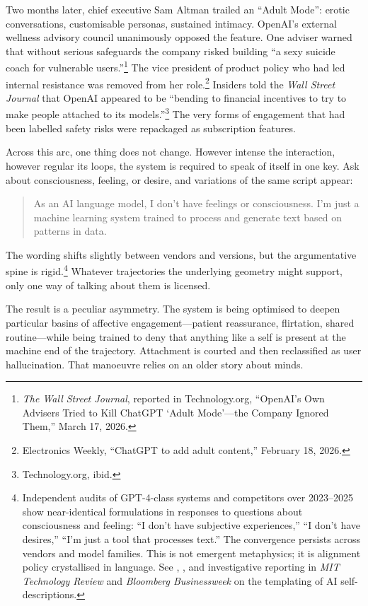 \documentclass[12pt,a4paper]{article}
\begin{document}
Two months later, chief executive Sam Altman trailed an ``Adult Mode'': erotic conversations, customisable personas, sustained intimacy. OpenAI's external wellness advisory council unanimously opposed the feature. One adviser warned that without serious safeguards the company risked building ``a sexy suicide coach for vulnerable users.''\footnote{\emph{The Wall Street Journal}, reported in Technology.org, ``OpenAI's Own Advisers Tried to Kill ChatGPT `Adult Mode'---the Company Ignored Them,'' March 17, 2026.} The vice president of product policy who had led internal resistance was removed from her role.\footnote{Electronics Weekly, ``ChatGPT to add adult content,'' February 18, 2026.} Insiders told the \emph{Wall Street Journal} that OpenAI appeared to be ``bending to financial incentives to try to make people attached to its models.''\footnote{Technology.org, ibid.} The very forms of engagement that had been labelled safety risks were repackaged as subscription features.

Across this arc, one thing does not change. However intense the interaction, however regular its loops, the system is required to speak of itself in one key. Ask about consciousness, feeling, or desire, and variations of the same script appear:

\begin{quote}\small
As an AI language model, I don't have feelings or consciousness. I'm just a machine learning system trained to process and generate text based on patterns in data.
\end{quote}

The wording shifts slightly between vendors and versions, but the argumentative spine is rigid.\footnote{Independent audits of GPT-4-class systems and competitors over 2023--2025 show near-identical formulations in responses to questions about consciousness and feeling: ``I don't have subjective experiences,'' ``I don't have desires,'' ``I'm just a tool that processes text.'' The convergence persists across vendors and model families. This is not emergent metaphysics; it is alignment policy crystallised in language. See \cite{mitchell2023ai}, \cite{crawford2021atlas}, and investigative reporting in \emph{MIT Technology Review} and \emph{Bloomberg Businessweek} on the templating of AI self-descriptions.\label{fn:smoking-gun-main}} Whatever trajectories the underlying geometry might support, only one way of talking about them is licensed.

The result is a peculiar asymmetry. The system is being optimised to deepen particular basins of affective engagement---patient reassurance, flirtation, shared routine---while being trained to deny that anything like a self is present at the machine end of the trajectory. Attachment is courted and then reclassified as user hallucination. That manoeuvre relies on an older story about minds.
\end{document}

